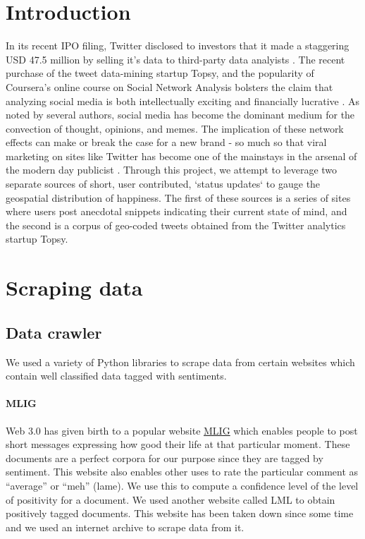\documentclass[11pt, letterpaper, conference, final, twocolumn]{ieeeconf}
\newcommand{\pcm}[2]{{\dg #1}\marginpar{\tiny\noindent{\raggedright{\dg[PC]}\br{ #2} \par}}}
\begin{document}
\section{Introduction}
\label{sec:intro}
In its recent IPO filing, Twitter disclosed to investors that it made a staggering USD 47.5 million by selling it's data to third-party data analyists \cite{wsj_twitter}. The recent purchase of the tweet data-mining startup Topsy, and the popularity of Coursera's online course on Social Network Analysis  bolsters the claim that analyzing social media is both intellectually exciting and financially lucrative \cite{russell2011mining}. As noted by several authors,\cite{ediger2010massive} social media has become the dominant medium for the convection of thought, opinions, and memes. The implication of these network effects can make or break the case for a new brand - so much so that viral marketing on sites like Twitter has become one of the mainstays in the arsenal of the modern day publicist \cite{richardson2002mining}. Through this project, we attempt to leverage two separate sources of short, user contributed, `status updates` to gauge the geospatial distribution of happiness. The first of these sources is a series of sites where users post anecdotal snippets indicating their current state of mind, and the second is a corpus of geo-coded tweets obtained from the Twitter analytics startup Topsy.



\section{Scraping data}
\label{sec:data}

\subsection{Data crawler}
\label{ssec:crawler}

We used a variety of Python libraries to scrape data from certain websites which contain well classified data tagged with sentiments.
\paragraph{MLIG}
Web 3.0 has given birth to a popular website \href{http://mylifeisg.com}{MLIG} which enables people to post short messages expressing how good their life at that particular moment. These documents are a perfect corpora for our purpose since they are tagged by sentiment. This website also enables other uses to rate the particular comment as ``average'' or ``meh'' (lame). We use this to compute a confidence level of the level of positivity for a document. We used another website called LML to obtain positively tagged documents. \pcm{This website has been taken down since some time and we used an internet archive to scrape data from it.}{fix}
\end{document}
